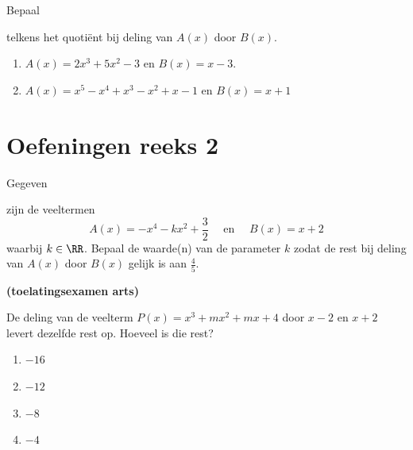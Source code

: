\documentclass{ximera}
\begin{document}
\begin{Oefening}\setcounter{enumi}{4}
\hypertarget{oef3.4}{Bepaal} telkens het quoti\"ent bij deling van $A(x)$ door $B(x)$.%
\begin{enumerate}

\item
$A(x) = 2x^3+5x^2-3$ \quad en \quad $B(x) = x-3$.
\item
$A(x) = x^5 - x^4 + x^3 - x^2 + x - 1$ \quad en \quad $B(x) = x+1$
\end{enumerate}
\end{Oefening}

\section*{Oefeningen reeks 2}

\begin{Oefening}\setcounter{enumi}{5}
\hypertarget{oef3.5}{Gegeven} zijn de veeltermen
\[
A(x) = -x^4 - kx^2+\frac{3}{2} \quad \text{ en } \quad B(x) = x+2
\]
waarbij $k \in \RR$. Bepaal de waarde(n) van de parameter $k$ zodat de rest bij deling van $A(x)$ door $B(x)$ gelijk is aan $\frac{4}{5}$. 
\end{Oefening}

\begin{Oefening}\setcounter{enumi}{6} 
\hypertarget{oef3.6}{{\bf (toelatingsexamen arts)}} 
De deling van de veelterm $P(x) = x^3 + mx^2 + mx + 4$ door $x-2$ en $x+2$ levert dezelfde rest op. Hoeveel is die rest?
\begin{multicols}{4} 
\begin{enumerate}

\item 
$-16$
\item 
$-12$ 
\item 
$-8$ 
\item
$-4$
\end{enumerate}
\end{multicols}
\end{Oefening}
\end{document}
